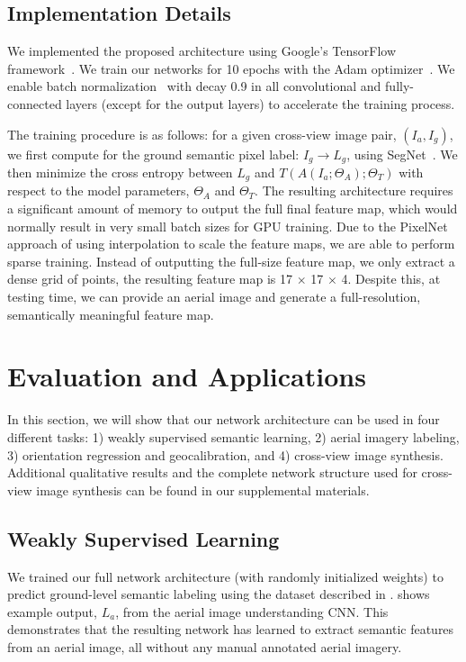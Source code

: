 \subsection{Implementation Details}
\label{sec:details}

We implemented the proposed architecture using Google's TensorFlow
framework~\cite{abadi2016tensorflow}. We train our networks for 10
epochs with the Adam optimizer~\cite{kingma2014adam}. We enable batch
normalization~\cite{ioffe2015batch} with decay 0.9 in all convolutional and 
fully-connected layers (except for the output layers) to accelerate
the training process. 

The training procedure is as follows: for a given cross-view image
pair, $(I_a, I_g)$, we first compute for the ground semantic pixel
label: $I_g \rightarrow L_g$, using
SegNet~\cite{badrinarayanan2015segnet}. We then minimize the cross
entropy between $L_g$ and $T(A(I_a;\Theta_A);\Theta_T)$ with respect
to the model parameters, $\Theta_A$ and $\Theta_T$.  The resulting
architecture requires a significant amount of memory to output the
full final feature map, which would normally result in very small
batch sizes for GPU training.  Due to the PixelNet approach of using
interpolation to scale the feature maps, we are able to perform sparse
training. Instead of outputting the full-size feature map, we only
extract a dense grid of points, the resulting feature map is 17
$\times$ 17 $\times$ 4.  Despite this, at testing time,  we can provide
an aerial image and generate a full-resolution, semantically meaningful
feature map.

\section{Evaluation and Applications}
In this section, we will show that our network architecture can be
used in four different tasks: 1) weakly supervised semantic learning, 
2) aerial imagery labeling, 3) orientation regression and geocalibration, 
and 4) cross-view image synthesis. Additional qualitative results and 
the complete network structure used for cross-view image synthesis 
can be found in our supplemental materials.

\subsection{Weakly Supervised Learning}
\label{sec:transfer}

We trained our full network architecture (with randomly initialized
weights) to predict ground-level semantic labeling using the dataset
described in .   shows example output,
$L_a$, from the aerial image understanding CNN. This demonstrates that
the resulting network has learned to extract semantic features from an
aerial image, all without any manual annotated aerial imagery.

